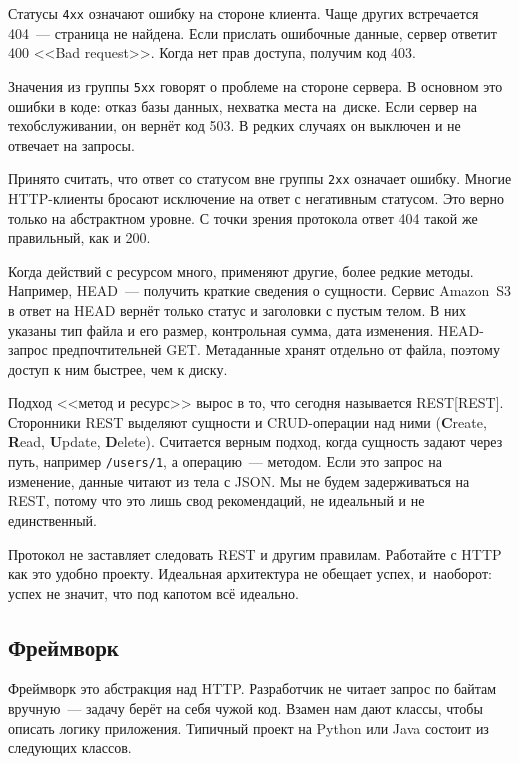 Статусы \verb|4хх| означают ошибку на стороне клиента. Чаще других встречается
404~--- страница не найдена. Если прислать ошибочные данные, сервер ответит 400
<<Bad request>>. Когда нет прав доступа, получим код 403.

Значения из группы \verb|5хх| говорят о проблеме на стороне сервера. В
основном это ошибки в коде: отказ базы данных, нехватка места на~диске. Если
сервер на техобслуживании, он вернёт код 503. В редких случаях он выключен и
не отвечает на запросы.

Принято считать, что ответ со статусом вне группы \verb|2хх| означает
ошибку. Многие HTTP-клиенты бросают исключение на ответ с негативным статусом.
Это верно только на абстрактном уровне. С точки зрения протокола ответ 404 такой
же правильный, как и 200.


Когда действий с ресурсом много, применяют другие, более редкие
методы. Например, HEAD~--- получить краткие сведения о сущности. Сервис
Amazon~S3 в ответ на HEAD вернёт только статус и заголовки с пустым телом. В
них указаны тип файла и его размер, контрольная сумма, дата
изменения. HEAD-запрос предпочтительней GET. Метаданные хранят отдельно от
файла, поэтому доступ к ним быстрее, чем к диску.


Подход <<метод и ресурс>> вырос в то, что сегодня называется
REST[REST]. Сторонники REST выделяют сущности и
CRUD-операции над ними (\textbf{C}reate, \textbf{R}ead, \textbf{U}pdate,
\textbf{D}elete). Считается верным подход, когда сущность задают через путь,
например \verb|/users/1|, а операцию~--- методом. Если это запрос на
изменение, данные читают из тела с JSON. Мы не будем задерживаться на REST,
потому что это лишь свод рекомендаций, не идеальный и не единственный.


Протокол не заставляет следовать REST и другим правилам. Работайте с HTTP как
это удобно проекту. Идеальная архитектура не обещает успех, и~наоборот: успех не
значит, что под капотом всё идеально.

\subsection{Фреймворк}


Фреймворк это абстракция над HTTP. Разработчик не читает запрос по байтам
вручную~--- задачу берёт на себя чужой код. Взамен нам дают классы, чтобы
описать логику приложения. Типичный проект на Python или Java состоит из
следующих классов.

